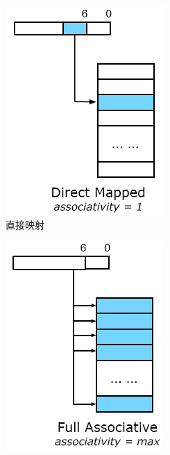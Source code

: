 \begin{figure}[htbp] 
    \centering
    \begin{subfigure}[b]{0.24\linewidth}
        \centering\includegraphics[width=0.9\linewidth]{figures/CacheAsso1.png}
        \caption{直接映射}
    \end{subfigure}%
    \begin{subfigure}[b]{0.24\linewidth}
        \centering\includegraphics[width=0.9\linewidth]{figures/CacheAsso2.png}

\end{subfigure}
\end{figure}
